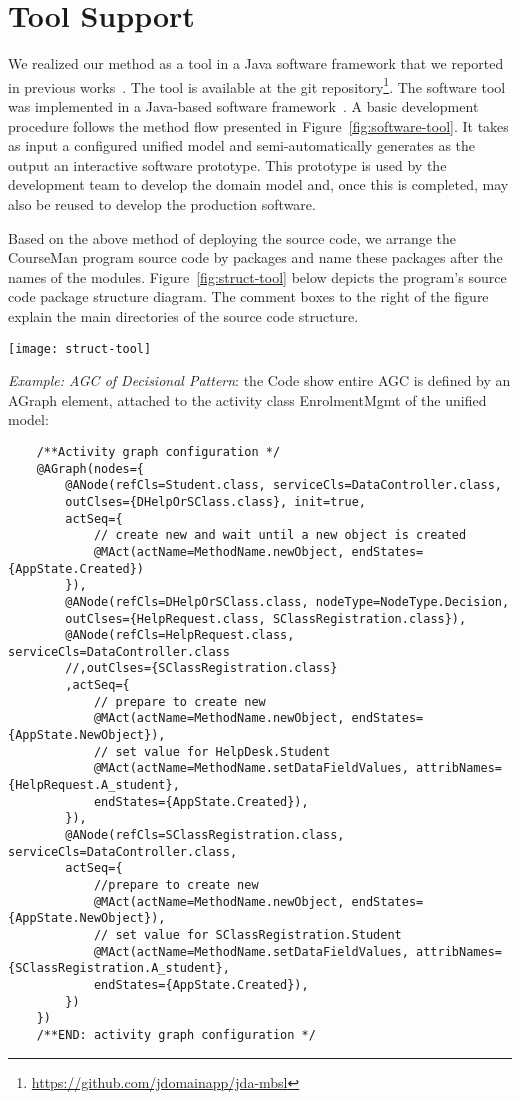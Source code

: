 \section{Tool Support}
\label{sect:tool} %
We realized our method as a tool in a Java software framework that we reported in previous works~\cite{le_domain_2018}. The tool is available at the git repository\footnote{\url{https://github.com/jdomainapp/jda-mbsl}}. The software tool was implemented in a Java-based software framework~\cite{le_jdomainapp_2017}. A basic development procedure follows the method flow presented in Figure~\ref{fig:software-tool}. It takes as input a configured unified model and semi-automatically generates as the output an interactive software prototype. This prototype is used by the development team to develop the domain model and, once this is completed, may also be reused to develop the production software.
%


Based on the above method of deploying the source code, we arrange the CourseMan program source code by packages and name these packages after the names of the modules. Figure~\ref{fig:struct-tool} below depicts the program's source code package structure diagram. The comment boxes to the right of the figure explain the main directories of the source code structure.
%
\begin{figure*}[ht]
	\centering
	\texttt{[image: struct-tool]}
	\caption{Structure diagram of the program source code} %
	\label{fig:struct-tool}
\end{figure*}
%

\textit{Example: AGC of Decisional Pattern}: the Code show entire AGC is defined by an AGraph element, attached to the activity class EnrolmentMgmt of the unified model:
\begin{verbatim}
	/**Activity graph configuration */
	@AGraph(nodes={
		@ANode(refCls=Student.class, serviceCls=DataController.class,
		outClses={DHelpOrSClass.class}, init=true, 
		actSeq={
			// create new and wait until a new object is created
			@MAct(actName=MethodName.newObject, endStates={AppState.Created})
		}),
		@ANode(refCls=DHelpOrSClass.class, nodeType=NodeType.Decision, 
		outClses={HelpRequest.class, SClassRegistration.class}),
		@ANode(refCls=HelpRequest.class, serviceCls=DataController.class 
		//,outClses={SClassRegistration.class}
		,actSeq={
			// prepare to create new
			@MAct(actName=MethodName.newObject, endStates={AppState.NewObject}),  
			// set value for HelpDesk.Student
			@MAct(actName=MethodName.setDataFieldValues, attribNames={HelpRequest.A_student},
			endStates={AppState.Created}),  
		}),
		@ANode(refCls=SClassRegistration.class, serviceCls=DataController.class, 
		actSeq={
			//prepare to create new
			@MAct(actName=MethodName.newObject, endStates={AppState.NewObject}),  
			// set value for SClassRegistration.Student
			@MAct(actName=MethodName.setDataFieldValues, attribNames={SClassRegistration.A_student},
			endStates={AppState.Created}),  
		})
	})
	/**END: activity graph configuration */
\end{verbatim}

